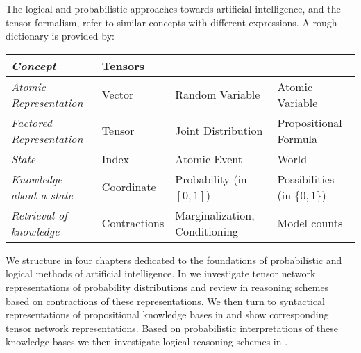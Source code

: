 The logical and probabilistic approaches towards artificial intelligence, and the tensor formalism, refer to similar concepts with different expressions. %
A rough dictionary is provided by:
\begin{center}
    \begin{tabular}{|p{\threecolumnwidth}|p{\fourcolumnwidth}|p{\fourcolumnwidth}|p{\fourcolumnwidth}|}
        \hline
        \textit{Concept}                 & \textbf{Tensors} & \textbf{\ProbabilityTheory{}} & \textbf{\PropositionalLogic{}} \\
        \hline
        \textit{Atomic Representation}   & Vector           & Random Variable               & Atomic Variable                \\
        \textit{Factored Representation} & Tensor           & Joint Distribution            & Propositional \hspace{1cm} Formula         \\
        \textit{State}                   & Index            & Atomic Event                  & World                          \\
        \textit{Knowledge about a state} & Coordinate       & Probability \hspace{1.5cm} (in $[0,1]$)      & Possibilities \hspace{1.5cm} (in $\{0,1\}$)   \\
        \textit{Retrieval of knowledge}  & Contractions     & Marginalization, Conditioning & Model counts                   \\
        \hline
    \end{tabular}
\end{center}



We structure  in four chapters dedicated to the foundations of probabilistic and logical methods of artificial intelligence.
In  we investigate tensor network representations of probability distributions and review in  reasoning schemes based on contractions of these representations.
We then turn to syntactical representations of propositional knowledge bases in  and show corresponding tensor network representations.
Based on probabilistic interpretations of these knowledge bases we then investigate logical reasoning schemes in .